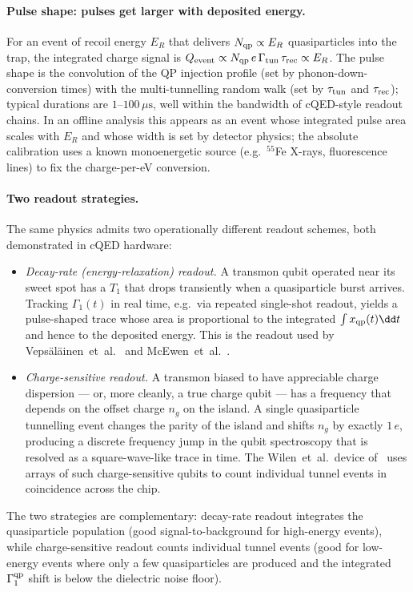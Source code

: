 \paragraph{Pulse shape: pulses get larger with deposited energy.}
For an event of recoil energy $E_R$ that delivers
$N_{\rm qp}\propto E_R$ quasiparticles into the trap, the
integrated charge signal is
$Q_{\rm event}\propto N_{\rm qp}\,e\,\Gamma_{\rm tun}\,\tau_{\rm rec}\propto E_R$.
The pulse shape is the convolution of the QP injection profile
(set by phonon-down-conversion times) with the multi-tunnelling
random walk (set by $\tau_{\rm tun}$ and $\tau_{\rm rec}$);
typical durations are $1$--$100\,\mu\text{s}$, well within the
bandwidth of cQED-style readout chains. In an offline analysis
this appears as an event whose integrated pulse area scales with
$E_R$ and whose width is set by detector physics; the absolute
calibration uses a known monoenergetic source (e.g.\ $^{55}$Fe
X-rays, fluorescence lines) to fix the charge-per-eV conversion.

\paragraph{Two readout strategies.}
The same physics admits two operationally different readout
schemes, both demonstrated in cQED hardware:
\begin{itemize}
  \item \emph{Decay-rate (energy-relaxation) readout.} A transmon
        qubit operated near its sweet spot has a $T_1$ that drops
        transiently when a quasiparticle burst arrives. Tracking
        $\Gamma_1(t)$ in real time, e.g.\ via repeated single-shot
        readout, yields a pulse-shaped trace whose area is
        proportional to the integrated $\int x_{\rm qp}(t)\dd t$
        and hence to the deposited energy. This is the readout
        used by Vepsäläinen~et~al.~\cite{vepsalainen2020} and
        McEwen~et~al.~\cite{mcewen2022}.
  \item \emph{Charge-sensitive readout.} A transmon biased to
        have appreciable charge dispersion --- or, more cleanly,
        a true charge qubit --- has a frequency that depends on
        the offset charge $n_g$ on the island. A single
        quasiparticle tunnelling event changes the parity of the
        island and shifts $n_g$ by exactly $1\,e$, producing a
        discrete frequency jump in the qubit spectroscopy that is
        resolved as a square-wave-like trace in time. The
        Wilen~et~al.\ device of~\cite{wilen2021} uses arrays of
        such charge-sensitive qubits to count individual tunnel
        events in coincidence across the chip.
\end{itemize}
The two strategies are complementary: decay-rate readout
integrates the quasiparticle population (good signal-to-background
for high-energy events), while charge-sensitive readout counts
individual tunnel events (good for low-energy events where only a
few quasiparticles are produced and the integrated $\Gamma_1^{\rm qp}$
shift is below the dielectric noise floor).

